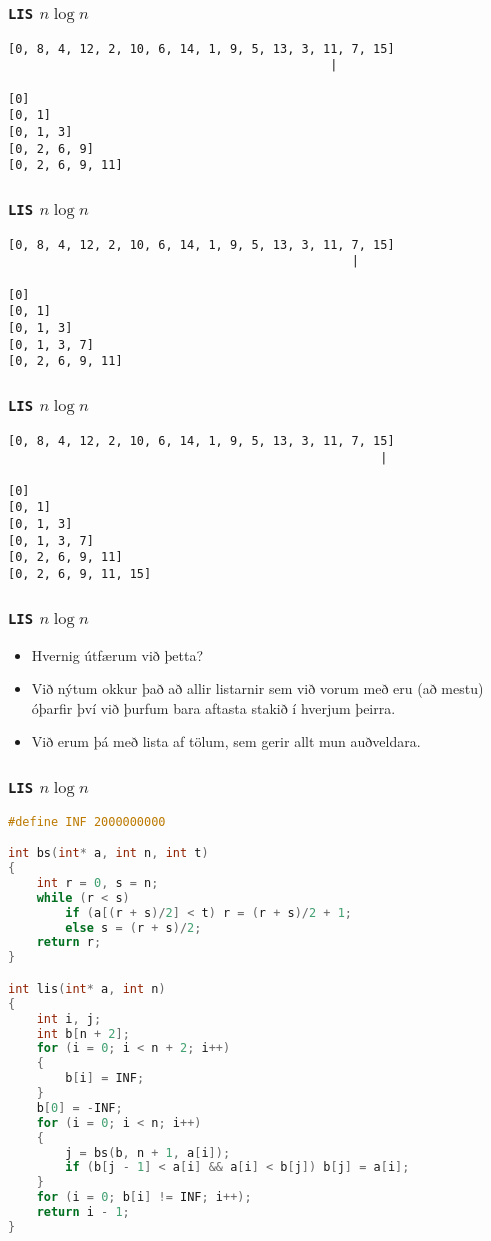 \documentclass{beamer}
\begin{document}
\begin{frame}[fragile]
	\frametitle{\texttt{LIS} $n\log n$}
\begin{verbatim}
[0, 8, 4, 12, 2, 10, 6, 14, 1, 9, 5, 13, 3, 11, 7, 15]
                                             |

[0]
[0, 1]
[0, 1, 3]
[0, 2, 6, 9]
[0, 2, 6, 9, 11]

\end{verbatim}
\end{frame}
\addtocounter{framenumber}{-1}

\begin{frame}[fragile]
	\frametitle{\texttt{LIS} $n\log n$}
\begin{verbatim}
[0, 8, 4, 12, 2, 10, 6, 14, 1, 9, 5, 13, 3, 11, 7, 15]
                                                |

[0]
[0, 1]
[0, 1, 3]
[0, 1, 3, 7]
[0, 2, 6, 9, 11]

\end{verbatim}
\end{frame}
\addtocounter{framenumber}{-1}

\begin{frame}[fragile]
	\frametitle{\texttt{LIS} $n\log n$}
\begin{verbatim}
[0, 8, 4, 12, 2, 10, 6, 14, 1, 9, 5, 13, 3, 11, 7, 15]
                                                    |

[0]
[0, 1]
[0, 1, 3]
[0, 1, 3, 7]
[0, 2, 6, 9, 11]
[0, 2, 6, 9, 11, 15]
\end{verbatim}
\end{frame}

\begin{frame}
	\frametitle{\texttt{LIS} $n\log n$}
	\begin{itemize}
		\item<1-> Hvernig útfærum við þetta?
		\item<2-> Við nýtum okkur það að allir listarnir sem við vorum með
			eru (að mestu) óþarfir því við þurfum bara aftasta stakið í hverjum þeirra.
		\item<3-> Við erum þá með lista af tölum, sem gerir allt mun auðveldara.
	\end{itemize}
\end{frame}

\begin{frame}[fragile]
	\frametitle{\texttt{LIS} $n\log n$}
	\tiny
	\begin{lstlisting}[language=C]
#define INF 2000000000

int bs(int* a, int n, int t)
{
	int r = 0, s = n;
	while (r < s)
		if (a[(r + s)/2] < t) r = (r + s)/2 + 1;
		else s = (r + s)/2;
	return r;
}

int lis(int* a, int n)
{
	int i, j;
	int b[n + 2];
	for (i = 0; i < n + 2; i++)
	{
		b[i] = INF;
	}
	b[0] = -INF;
	for (i = 0; i < n; i++)
	{
		j = bs(b, n + 1, a[i]);
		if (b[j - 1] < a[i] && a[i] < b[j]) b[j] = a[i];
	}
	for (i = 0; b[i] != INF; i++);
	return i - 1;
}
	\end{lstlisting}
\end{frame}
\end{document}
